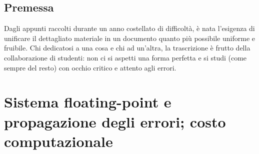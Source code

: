 \documentclass[12pt,a4paper,headings=optiontohead]{scrbook}
\begin{document}
\begin{center}
\pagebreak

\section*{Premessa}
\begin{minipage}{0.9\textwidth} \large

Dagli appunti raccolti durante un anno costellato di difficoltà, è nata l'esigenza di unificare il dettagliato materiale in un documento quanto più possibile uniforme e fruibile. Chi dedicatosi a una cosa e chi ad un'altra, la trascrizione è frutto della collaborazione di studenti: non ci si aspetti una forma perfetta e si studi (come sempre del resto) con occhio critico e attento agli errori.

\end{minipage}

\end{center}
\pagebreak


\tableofcontents


\chapter{Sistema floating-point e propagazione degli errori; costo computazionale}

\end{document}
